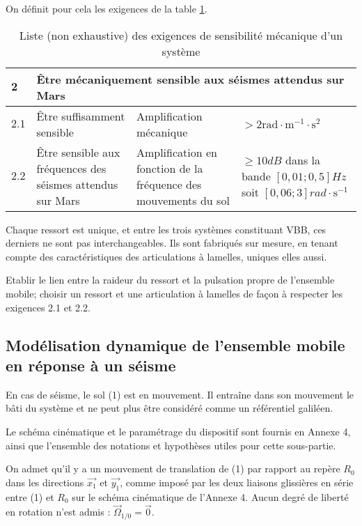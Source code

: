 On définit pour cela les exigences de la table \ref{ccmp2023_tab_02}.


\begin{table}
\centering
\begin{tabular}{lp{5cm}p{5cm}p{4cm}}
\hline
$\mathbf{2}$ &\multicolumn{3}{l}{Être mécaniquement sensible aux séismes attendus sur Mars} \\
\hline
$\mathbf{2.1}$ & Être suffisamment sensible & Amplification mécanique & $>2 \mathrm{rad} \cdot \mathrm{m}^{-1} \cdot \mathrm{s}^{2}$ \\
\hline
$\mathbf{2.2}$ & Être sensible aux fréquences des séismes attendus sur Mars & 
Amplification en fonction de la fréquence des mouvements du sol & $\geq 10 \si{dB}$ dans la bande $[0,01 ; 0,5] \si{Hz}$ soit $[0,06 ; 3] \si{rad} \cdot \mathrm{s}^{-1}$  \\
\hline
\end{tabular}
\caption{Liste (non exhaustive) des exigences de sensibilité mécanique d'un système \label{ccmp2023_tab_02}}
\end{table}

Chaque ressort est unique, et entre les trois systèmes constituant VBB, ces derniers ne sont pas interchangeables. Ils sont fabriqués sur mesure, en tenant compte des caractéristiques des articulations à lamelles, uniques elles aussi.

\begin{obj}
Etablir le lien entre la raideur du ressort et la pulsation propre de l'ensemble mobile; choisir un ressort et une articulation à lamelles de façon à respecter les exigences 2.1 et 2.2.
\end{obj}


\subsection{Modélisation dynamique de l'ensemble mobile en réponse à un séisme}
En cas de séisme, le sol (1) est en mouvement. Il entraîne dans son mouvement le bâti du système et ne peut plus être considéré comme un référentiel galiléen.

Le schéma cinématique et le paramétrage du dispositif sont fournis en Annexe 4, ainsi que l'ensemble des notations et hypothèses utiles pour cette sous-partie.

On admet qu'il y a un mouvement de translation de (1) par rapport au repère $R_{0}$ dans les directions $\overrightarrow{x_{1}}$ et $\overrightarrow{y_{1}}$, comme imposé par les deux liaisons glissières en série entre (1) et $R_{0}$ sur le schéma cinématique de l'Annexe 4. Aucun degré de liberté en rotation n'est admis : $\vec{\Omega}_{1 / 0}=\overrightarrow{0}$.

